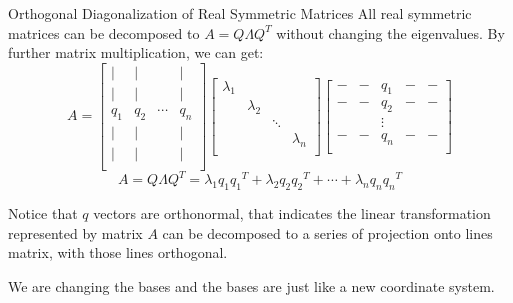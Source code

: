 \documentclass{beamer}
\begin{document}
\begin{frame}{Orthogonal Diagonalization of Real Symmetric Matrices}
All real symmetric matrices can be decomposed to $A=Q\varLambda Q^T$ without changing the eigenvalues. By further matrix multiplication, we can get:
\begin{equation*}
    A=\left[ \begin{matrix}
        |&		|&		&		|\\
        |&		|&		&		|\\
        q_1&		q_2&		\cdots&		q_n\\
        |&		|&		&		|\\
        |&		|&		&		|\\
    \end{matrix} \right] \left[ \begin{matrix}
        \lambda _1&		&		&		\\
        &		\lambda _2&		&		\\
        &		&		\ddots&		\\
        &		&		&		\lambda _n\\
    \end{matrix} \right] \left[ \begin{matrix}
        -&		-&		q_1&		-&		-\\
        -&		-&		q_2&		-&		-\\
        &		&		\vdots&		&		\\
        -&		-&		q_n&		-&		-\\
    \end{matrix} \right]
\end{equation*}
\begin{equation*}
    A=Q\varLambda Q^T=\lambda _1q_1{q_1}^T+\lambda _2q_2{q_2}^T+\cdots +\lambda _nq_n{q_n}^T
\end{equation*}

Notice that $q$ vectors are orthonormal, that indicates the linear transformation represented by matrix $A$ can be decomposed to a series of projection onto lines matrix, with those lines orthogonal.

\vspace{3pt}
We are changing the bases and the bases are just like a new coordinate system.
\end{frame}
\end{document}
